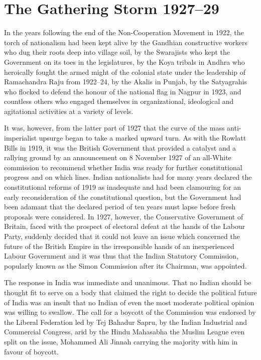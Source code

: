 
\chapter{The Gathering Storm 1927--29}

In the years following the end of the Non-Cooperation Movement in 1922, the torch of nationalism had been kept alive by the Gandhian constructive workers who dug their roots deep into village soil, by the Swarajists who kept the Government on its toes in the legislatures, by the Koya tribals in Andhra who heroically fought the armed might of the colonial state under the leadership of Ramachandra Raju from 1922--24, by the Akalis in Punjab, by the Satyagrahis who flocked to defend the honour of the national flag in Nagpur in 1923, and countless others who engaged themselves in organizational, ideological and agitational activities at a variety of levels. 

It was, however, from the latter part of 1927 that the curve of the mass anti-imperialist upsurge began to take a marked upward turn. As with the Rowlatt Bills in 1919, it was the British Government that provided a catalyst and a rallying ground by an announcement on 8 November 1927 of an all-White commission to recommend whether India was ready for further constitutional progress and on which lines. Indian nationalists had for many years declared the constitutional reforms of 1919 as inadequate and had been clamouring for an early reconsideration of the constitutional question, but the Government had been adamant that the declared period of ten years must lapse before fresh proposals were considered. In 1927, however, the Conservative Government of Britain, faced with the prospect of electoral defeat at the hands of the Labour Party, suddenly decided that it could not leave an issue which concerned the future of the British Empire in the irresponsible hands of an inexperienced Labour Government and it was thus that the Indian Statutory Commission, popularly known as the Simon Commission after its Chairman, was appointed. 

The response in India was immediate and unanimous. That no Indian should be thought fit to serve on a body that claimed the right to decide the political future of India was an insult that no Indian of even the most moderate political opinion was willing to swallow. The call for a boycott of the Commission was endorsed by the Liberal Federation led by Tej Bahadur Sapru, by the Indian Industrial and Commercial Congress, arid by the Hindu Mahasabha the Muslim League even split on the issue, Mohammed Ali Jinnah carrying the majority with him in favour of boycott. 


